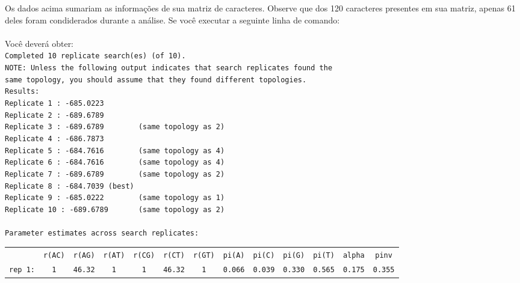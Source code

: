 \begin{refsection}
\normalsize

Os dados acima sumariam as informações de sua matriz de caracteres. Observe que dos 120 caracteres presentes em sua matriz, apenas 61 deles foram condiderados durante a análise. Se você executar a seguinte linha de comando:\\

\\

Você deverá obter:\\

\scriptsize
\noindent\texttt{Completed~10~replicate~search(es)~(of~10).}\\

\texttt{NOTE:~Unless~the~following~output~indicates~that~search~replicates~found~the}\\
\indent\texttt{same~topology,~you~should~assume~that~they~found~different~topologies.}\\
\texttt{Results:}\\
\texttt{Replicate~1~:~-685.0223~~~~~~~}\\
\texttt{Replicate~2~:~-689.6789~~~~~~~}\\
\texttt{Replicate~3~:~-689.6789~~~~~~~~(same~topology~as~2)}\\
\texttt{Replicate~4~:~-686.7873~~~~~~~}\\
\texttt{Replicate~5~:~-684.7616~~~~~~~~(same~topology~as~4)}\\
\texttt{Replicate~6~:~-684.7616~~~~~~~~(same~topology~as~4)}\\
\texttt{Replicate~7~:~-689.6789~~~~~~~~(same~topology~as~2)}\\
\texttt{Replicate~8~:~-684.7039~(best)}\\
\texttt{Replicate~9~:~-685.0222~~~~~~~~(same~topology~as~1)}\\
\texttt{Replicate~10~:~-689.6789~~~~~~~(same~topology~as~2)}\\
\texttt{}\\
\texttt{Parameter~estimates~across~search~replicates:}
\begin{table}[H]
\scriptsize
\begin{tabular}{lcccccccccccc}
 & \texttt{r(AC)} & \texttt{r(AG)} & \texttt{r(AT)} & \texttt{r(CG)} & \texttt{r(CT)} & \texttt{r(GT)} & \texttt{pi(A)} & \texttt{pi(C)} & \texttt{pi(G)} & \texttt{pi(T)} & \texttt{alpha} & \texttt{pinv}\\
\texttt{rep 1:} & \texttt{1} & \texttt{46.32} & \texttt{1} & \texttt{1} & \texttt{46.32} & \texttt{1} & \texttt{0.066} & \texttt{0.039} & \texttt{0.330} & \texttt{0.565} & \texttt{0.175} & \texttt{0.355}\\

\end{tabular}
\end{table}
\end{refsection}
